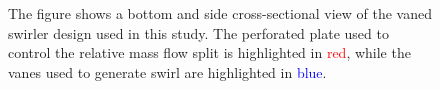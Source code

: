 \begin{figure}
\begin{tikzpicture}
\end{tikzpicture}

\caption[Schematic of a vaned swirler]{The figure shows a bottom and side cross-sectional view of the vaned swirler design used in this study. The perforated plate used to control the relative mass flow split is highlighted in \textcolor{red}{red}, while the vanes used to generate swirl are highlighted in \textcolor{blue}{blue}.}

\label{fig:swirler}

\end{figure}

